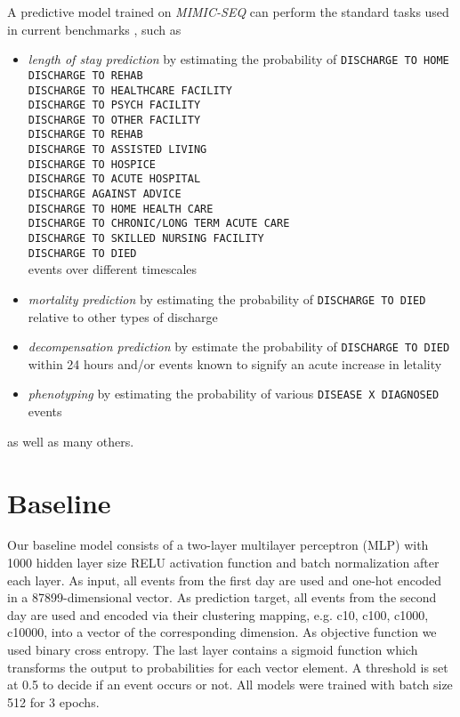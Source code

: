 A predictive model trained on \emph{MIMIC-SEQ} can perform the standard tasks used in current benchmarks \cite{harutyunyanMultitaskLearningBenchmarking2019}, such as
\begin{itemize}
    \item \emph{length of stay prediction} by estimating the probability of \texttt{DISCHARGE TO HOME} \\ \texttt{DISCHARGE TO REHAB} \\ \texttt{DISCHARGE TO HEALTHCARE FACILITY} \\ \texttt{DISCHARGE TO PSYCH FACILITY}\\\texttt{DISCHARGE TO OTHER FACILITY}\\\texttt{DISCHARGE TO REHAB}\\\texttt{DISCHARGE TO ASSISTED LIVING}\\\texttt{DISCHARGE TO HOSPICE}\\\texttt{DISCHARGE TO ACUTE HOSPITAL}\\\texttt{DISCHARGE AGAINST ADVICE} \\ \texttt{DISCHARGE TO HOME HEALTH CARE} \\ \texttt{DISCHARGE TO CHRONIC/LONG TERM ACUTE CARE} \\ \texttt{DISCHARGE TO SKILLED NURSING FACILITY} \\ \texttt{DISCHARGE TO DIED} \\ events over different timescales
    \item \emph{mortality prediction} by estimating the probability of \texttt{DISCHARGE TO DIED} relative to other types of discharge
    \item \emph{decompensation prediction} by estimate the probability of \texttt{DISCHARGE TO DIED} within 24 hours and/or events known to signify an acute increase in letality
    \item \emph{phenotyping} by estimating the probability of various \texttt{DISEASE X DIAGNOSED} events
\end{itemize}

as well as many others.

\newpage
\section{Baseline}
\label{sec:baseline}

Our baseline model consists of a two-layer multilayer perceptron (MLP) with 1000 hidden layer size RELU \cite{agarapDeepLearningUsing2018} activation function and batch normalization after each layer. As input, all events from the first day are used and one-hot encoded in a 87899-dimensional vector. As prediction target, all events from the second day are used and encoded via their clustering mapping, e.g. c10, c100, c1000, c10000, into a vector of the corresponding dimension. As objective function we used binary cross entropy. The last layer contains a sigmoid function which transforms the output to probabilities for each vector element. A threshold is set at 0.5 to decide if an event occurs or not. All models were trained with batch size 512 for 3 epochs.

